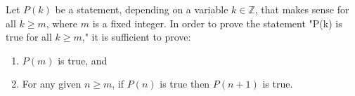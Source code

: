 Let $P(k)$ be a statement, depending on a variable $k \in \mathbb{Z}$, that makes sense for all $k \geq m$, where $m$ is a fixed integer. In order to prove the statement "P(k) is true for all $k \geq m$," it is sufficient to prove:
\begin{enumerate}
    \item $P(m)$ is true, and
    \item For any given $n \geq m$, if $P(n)$ is true then $P(n+1)$ is true.
\end{enumerate}